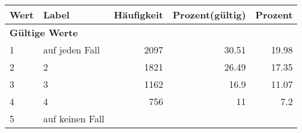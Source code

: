      \begin{longtable}{lXrrr}
     \toprule
     \textbf{Wert} & \textbf{Label} & \textbf{Häufigkeit} & \textbf{Prozent(gültig)} & \textbf{Prozent} \\
     \endhead
     \midrule
     \multicolumn{5}{l}{\textbf{Gültige Werte}}\\

     1 &
     \multicolumn{1}{X}{ auf jeden Fall   } &


       \num{2097} &
       \num[round-mode=places,round-precision=2]{30,51} &
         \num[round-mode=places,round-precision=2]{19,98} \\

     2 &
     \multicolumn{1}{X}{ 2   } &


       \num{1821} &
       \num[round-mode=places,round-precision=2]{26,49} &
         \num[round-mode=places,round-precision=2]{17,35} \\

     3 &
     \multicolumn{1}{X}{ 3   } &


       \num{1162} &
       \num[round-mode=places,round-precision=2]{16,9} &
         \num[round-mode=places,round-precision=2]{11,07} \\

     4 &
     \multicolumn{1}{X}{ 4   } &


       \num{756} &
       \num[round-mode=places,round-precision=2]{11} &
         \num[round-mode=places,round-precision=2]{7,2} \\

     5 &
     \multicolumn{1}{X}{ auf keinen Fall   } &



\end{longtable}
